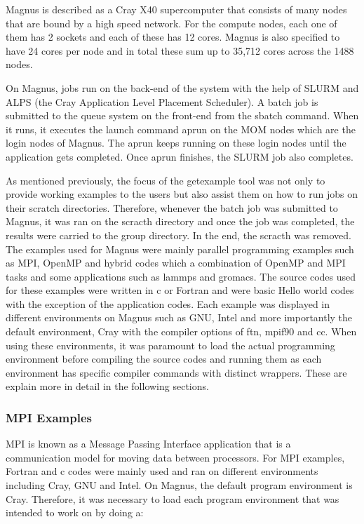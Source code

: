 \documentclass[journal]{IEEEtran}
\begin{document}
Magnus is described as a Cray X40 supercomputer that consists of many nodes that are bound by a high speed network. For the compute nodes, each one 
of them has 2 sockets and each of these has 12 cores. Magnus is also specified to have 24 cores per node and in total these sum up to 35,712 cores across 
the 1488 nodes. 

On Magnus, jobs run on the back-end of the system with the help of SLURM and ALPS (the Cray Application Level Placement Scheduler). A 
batch job is submitted to the queue system on the front-end from the sbatch command. When it runs, it executes the launch command aprun on the MOM nodes 
which are the login nodes of Magnus. The aprun keeps running on these login nodes until the application gets completed. Once aprun finishes, the SLURM 
job also completes.

As mentioned previously, the focus of the getexample tool was not only to provide working examples to the users but also assist them on how to run jobs
on their scratch directories. Therefore, whenever the batch job was submitted to Magnus, it was ran on the scracth directory and once the job was 
completed, the results were carried to the group directory. In the end, the scracth was removed. The examples used for Magnus were mainly parallel
programming examples such as MPI, OpenMP and hybrid codes which a combination of OpenMP and MPI tasks and some applications such as lammps and gromacs.
The source codes used for these examples were written in c or Fortran and were basic Hello world codes with the exception of the application codes.
Each example was displayed in different environments on Magnus such as GNU, Intel and more importantly the default environment, Cray with the compiler
options of ftn, mpif90 and cc. When using these environments, it was paramount to load the actual programming environment before compiling the source
codes and running them as each environment has specific compiler commands with distinct wrappers. These are explain more in detail in the following
sections.


\subsubsection{MPI Examples}

MPI is known as a Message Passing Interface application that is a communication model for moving data between processors. For MPI examples, Fortran and 
c codes were mainly used and ran on different environments including Cray, GNU and Intel. On Magnus, the default program environment is Cray. Therefore, 
it was necessary to load each program environment that was intended to work on by doing a:
\end{document}

